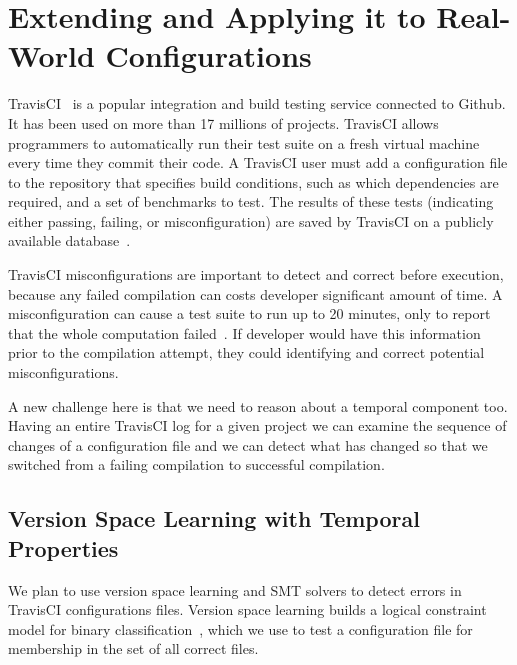 
\section{Extending \app and Applying it to Real-World Configurations}
\label{sec:travis}

TravisCI~\cite{API} is a popular integration and build testing service 
connected to Github. It has been used on more than 17 
millions of projects. 
TravisCI allows programmers to automatically run their test suite on a fresh virtual machine every time they commit their code.
A TravisCI user must add a configuration file to the repository that specifies build conditions, 
such as which dependencies are required, and a set of benchmarks to test. 
The results of these tests (indicating either passing, failing, or misconfiguration) 
are saved by TravisCI on a publicly available database~\cite{API}.

TravisCI misconfigurations are important to detect and correct before execution,
because any failed compilation can costs developer significant amount 
of time. A misconfiguration can cause a test suite to run up to 20 
minutes, only to report that the whole computation failed~\cite{API}.
If developer would have this information prior to the compilation attempt, they could
 identifying and correct potential misconfigurations.

A new challenge here is that we need to reason about a 
temporal component too. Having an entire TravisCI log for a given
project we can examine the sequence of changes of a configuration file
and we can detect what has changed so that we switched from a failing 
compilation to successful compilation. 


\subsection{Version Space Learning with Temporal Properties} 

We plan to use version space learning and SMT solvers to detect errors in 
TravisCI configurations files. Version space learning 
builds a logical constraint model for binary
classification~\cite{mitchell77}, which we use to test a configuration file for 
membership in the set of all correct files.

